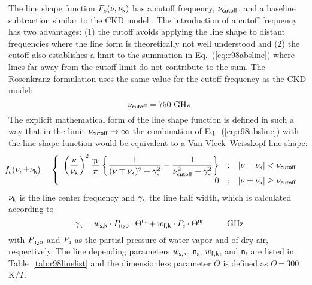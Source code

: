 {The line shape function $F_{c}(\nu,\nu_{\sf k})$ has a cutoff frequency, $\nu_{\sf cutoff}$,
and a baseline subtraction similar to the CKD model \cite{clough:89}.
The introduction of a cutoff frequency has two advantages: (1) the
cutoff avoids applying the line shape to distant frequencies where the 
line form is theoretically not well understood and (2) the cutoff also
establishes a limit to the summation in Eq.~(\ref{eq:r98absline}) where lines
far away from the cutoff limit do not contribute to the sum.  
The Rosenkranz formulation uses the same value for
the cutoff frequency as the CKD model:
\begin{equation} 
 \label{cutoff}
 \nu_{\sf cutoff} = 750\mbox{ GHz}
\end{equation}
%
The explicit mathematical form of the line shape function is defined 
in such a way that in the limit $\nu_{\sf cutoff} \rightarrow \infty$ the 
combination of Eq.~(\ref{eq:r98absline}) with the line shape function would 
be equivalent to a Van Vleck--Weisskopf \citep{vanvleck:45} line shape: 
\begin{equation}
 \label{eq:r98lineshape}
 \hspace*{-5mm}\shapefpm = 
   \left \{ \begin{array}{r@{\quad:\quad}l} 
   \left (\displaystyle{\frac{\nu}{\nuk}}\right )^2 
   \displaystyle{\frac{\gamk}{\pi}} 
   \left \{ \displaystyle{\frac{1}{(\nu \mp \nuk)^2 + \gamk^2}} - 
   \displaystyle{\frac{1}{\nucut^2 + \gamk^2}} \right \}
   & |\nu \pm \nuk| < \nucut \\ 
   0 & |\nu \pm \nuk| \geq \nucut
                       \end{array} \right.
\end{equation}
$\nu_{\sf k}$ is the line center frequency and $\gamma_{\sf k}$ the line
half width, which is calculated according to 
\begin{equation}
 \label{eq:r98gamma}
 \gamk = \ws \cdot \phzo \cdot \Theta^{\xs} + 
         \wf \cdot \pda  \cdot \Theta^{\xf}\hspace*{10mm}\mbox{GHz}
\end{equation}
with $P_{\mbox{\tiny \sf H}_{2}\mbox{\tiny \sf O}}$ and $P_{\mbox{\tiny \sf d}}$ as the partial pressure of water vapor and of 
dry air, respectively. The line depending parameters $w_{\sf s,k}$, ${\sf n}_{\mbox{\tiny \sf s}}$, 
$w_{\sf f,k}$, and ${\sf n}_{\mbox{\tiny \sf f}}$ are listed in Table~\ref{tab:r98linelist} and the 
dimensionless parameter $\Theta$ is defined as $\Theta$\,=\,300\,K/$T$.

}
